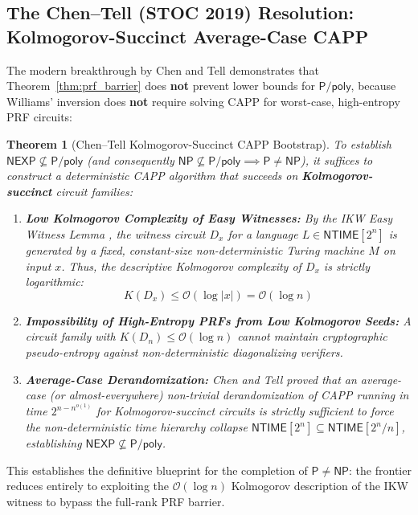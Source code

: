 \documentclass[11pt,a4paper]{article}
\newtheorem{theorem}{Theorem}[section]
\theoremstyle{definition}
\theoremstyle{remark}
\newcommand{\NP}{\mathsf{NP}}
\newcommand{\PP}{\mathsf{P}}
\newcommand{\Ppoly}{\mathsf{P/poly}}
\newcommand{\NEXP}{\mathsf{NEXP}}
\newcommand{\NTIME}{\mathsf{NTIME}}
\begin{document}
\subsection{The Chen--Tell (STOC 2019) Resolution: Kolmogorov-Succinct Average-Case CAPP}

The modern breakthrough by Chen and Tell \cite{chen19} demonstrates that Theorem~\ref{thm:prf_barrier} does \textbf{not} prevent lower bounds for $\Ppoly$, because Williams' inversion does \textbf{not} require solving CAPP for worst-case, high-entropy PRF circuits:

\begin{theorem}[Chen--Tell Kolmogorov-Succinct CAPP Bootstrap]\label{thm:chen_tell}
To establish $\NEXP \not\subseteq \Ppoly$ (and consequently $\NP \not\subseteq \Ppoly \implies \PP \neq \NP$), it suffices to construct a deterministic CAPP algorithm that succeeds on \textbf{Kolmogorov-succinct} circuit families:
\begin{enumerate}
    \item \textbf{Low Kolmogorov Complexity of Easy Witnesses:} By the IKW Easy Witness Lemma \cite{ikw02}, the witness circuit $D_x$ for a language $L \in \NTIME[2^n]$ is generated by a fixed, constant-size non-deterministic Turing machine $M$ on input $x$. Thus, the descriptive Kolmogorov complexity of $D_x$ is strictly logarithmic:
    \[
    K(D_x) \le \mathcal{O}(\log |x|) = \mathcal{O}(\log n)
    \]
    \item \textbf{Impossibility of High-Entropy PRFs from Low Kolmogorov Seeds:} A circuit family with $K(D_n) \le \mathcal{O}(\log n)$ cannot maintain cryptographic pseudo-entropy against non-deterministic diagonalizing verifiers.
    \item \textbf{Average-Case Derandomization:} Chen and Tell \cite{chen19} proved that an average-case (or almost-everywhere) non-trivial derandomization of CAPP running in time $2^{n - n^{o(1)}}$ for Kolmogorov-succinct circuits is strictly sufficient to force the non-deterministic time hierarchy collapse $\NTIME[2^n] \subseteq \NTIME[2^n/n]$, establishing $\NEXP \not\subseteq \Ppoly$.
\end{enumerate}
\end{theorem}

This establishes the definitive blueprint for the completion of $\PP \neq \NP$: the frontier reduces entirely to exploiting the $\mathcal{O}(\log n)$ Kolmogorov description of the IKW witness to bypass the full-rank PRF barrier.

\end{document}
